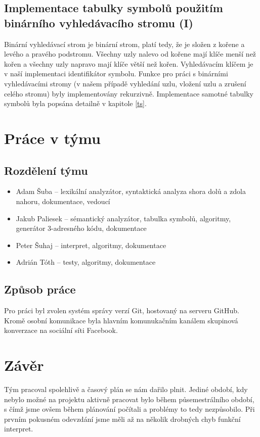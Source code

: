 \documentclass[a4paper, 11pt]{article}
\begin{document}
    \subsection{Implementace tabulky symbolů použitím binárního vyhledávacího stromu (I)}
    Binární vyhledávací strom je binární strom, platí tedy, že je složen z kořene a levého a pravého podstromu. Všechny uzly nalevo od kořene mají klíče menší než kořen a všechny uzly napravo mají klíče větší než kořen. Vyhledávacím klíčem je v naší implementaci identifikátor symbolu. Funkce pro práci s binárními vyhledávacími stromy (v našem případě vyhledání uzlu, vložení uzlu a zrušení celého stromu) byly implementovány rekurzivně. Implementace samotné tabulky symbolů byla popsána detailně v kapitole \ref{ts}.
    \section{Práce v týmu}
    \subsection{Rozdělení týmu}
    \begin{itemize}
        \item Adam Šuba – lexikální analyzátor, syntaktická analyza shora dolů a zdola nahoru, dokumentace, vedoucí
        \item Jakub Paliesek – sémantický analyzátor, tabulka symbolů, algoritmy, generátor 3-adresného kódu, dokumentace
        \item Peter Šuhaj – interpret, algoritmy, dokumentace
        \item Adrián Tóth – testy, algoritmy, dokumentace
    \end{itemize}
    \subsection{Způsob práce}
    Pro práci byl zvolen systém správy verzí Git, hostovaný na serveru GitHub. Kromě osobní komunikace byla hlavním komunukačním kanálem skupinová konverzace na sociální síti Facebook.
    \section{Závěr}
    Tým pracoval spolehlivě a časový plán se nám dařilo plnit. Jediné období, kdy nebylo možné na projektu aktivně pracovat bylo během půsemestrálního období, s čímž jsme ovšem během plánování počítali a problémy to tedy nezpůsobilo. Při prvním pokusném odevzdání jsme měli až na několik drobných chyb funkční interpret.
\end{document}
